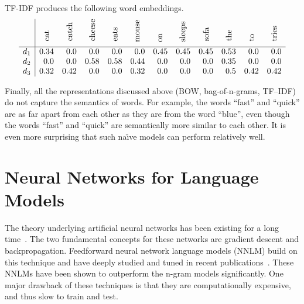 TF-IDF produces the following word embeddings.
\begin{displaymath}
\begin{array}{l|rrrrrrrrrrr}
& \multicolumn{1}{c}{\rotatebox[origin=l]{90}{cat}} &  \multicolumn{1}{c}{\rotatebox[origin=l]{90}{catch}} &  \multicolumn{1}{c}{\rotatebox[origin=l]{90}{cheese}} & \multicolumn{1}{c}{\rotatebox[origin=l]{90}{eats}} & \multicolumn{1}{c}{\rotatebox[origin=l]{90}{mouse}} & \multicolumn{1}{c}{\rotatebox[origin=l]{90}{on}} & \multicolumn{1}{c}{\rotatebox[origin=l]{90}{sleeps}} & \multicolumn{1}{c}{\rotatebox[origin=l]{90}{sofa}} & \multicolumn{1}{c}{\rotatebox[origin=l]{90}{the}} & \multicolumn{1}{c}{\rotatebox[origin=l]{90}{to}} & \multicolumn{1}{c}{\rotatebox[origin=l]{90}{tries}} \\ 
\hline
d_1 & 0.34 & 0.0 & 0.0 & 0.0 & 0.0 & 0.45 & 0.45 & 0.45 & 0.53 & 0.0 & 0.0\\
d_2 & 0.0 & 0.0 & 0.58 & 0.58 & 0.44 & 0.0 & 0.0 & 0.0 & 0.35 & 0.0 & 0.0\\
d_3 & 0.32 & 0.42 & 0.0 & 0.0 & 0.32 & 0.0 & 0.0 & 0.0 & 0.5 & 0.42 & 0.42\\
\end{array}
\end{displaymath}

Finally, all the representations discussed above (BOW, bag-of-n-grams, TF--IDF) do not capture the semantics of words. For example, the words ``fast'' and ``quick'' are as far apart from each other as they are from the word ``blue'', even though the words ``fast'' and ``quick'' are semantically more similar to each other. It is even more surprising that such na{\"\i}ve models can perform relatively well.

\section{Neural Networks for Language Models}

The theory underlying artificial neural networks has been existing for a long time~\cite{Ackley1985, LeCun1985, Rumelhart1986}. The two fundamental concepts for these networks are gradient descent and backpropagation. Feedforward neural network language models (NNLM) build on this technique and have deeply studied and tuned in recent publications~\cite{Bengio2006, Collobert2008, Mnih2009, Turian2010}. These NNLMs have been shown to outperform the n-gram models significantly. One major drawback of these techniques is that they are computationally expensive, and thus slow to train and test.

